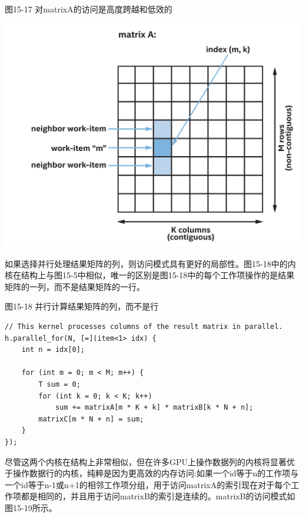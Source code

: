 \hspace*{\fill} \par %
图15-17 对matrixA的访问是高度跨越和低效的
\begin{center}
	\includegraphics[width=1.0\textwidth]{content/chapter-15/images/13}
\end{center}

如果选择并行处理结果矩阵的列，则访问模式具有更好的局部性。图15-18中的内核在结构上与图15-5中相似，唯一的区别是图15-18中的每个工作项操作的是结果矩阵的一列，而不是结果矩阵的一行。\par

\hspace*{\fill} \par %
图15-18 并行计算结果矩阵的列，而不是行
\begin{lstlisting}[caption={}]
// This kernel processes columns of the result matrix in parallel.
h.parallel_for(N, [=](item<1> idx) {
	int n = idx[0];
	
	for (int m = 0; m < M; m++) {
		T sum = 0;
		for (int k = 0; k < K; k++)
			sum += matrixA[m * K + k] * matrixB[k * N + n];
		matrixC[m * N + n] = sum;
	}
});
\end{lstlisting}

尽管这两个内核在结构上非常相似，但在许多GPU上操作数据列的内核将显著优于操作数据行的内核，纯粹是因为更高效的内存访问:如果一个id等于n的工作项与一个id等于n-1或n+1的相邻工作项分组，用于访问matrixA的索引现在对于每个工作项都是相同的，并且用于访问matrixB的索引是连续的。matrixB的访问模式如图15-19所示。\par

